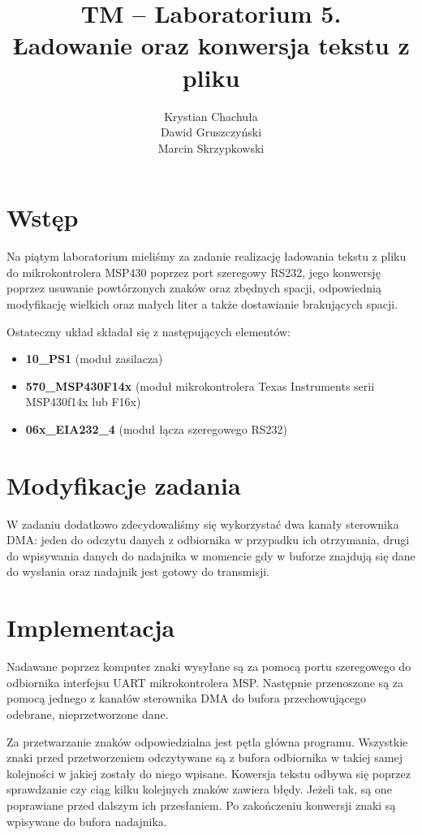 \documentclass[fleqn]{article}
\title{TM -- Laboratorium 5. \\ \large Ładowanie oraz konwersja tekstu z pliku}
\author{Krystian Chachuła \\ Dawid Gruszczyński \\ Marcin Skrzypkowski}
\begin{document}
\maketitle

\setcounter{page}{0}
\thispagestyle{empty}

\pagebreak

\setcounter{page}{1}

\section{Wstęp}
Na piątym laboratorium mieliśmy za zadanie realizację ładowania tekstu z pliku do mikrokontrolera MSP430 poprzez port szeregowy RS232, jego konwersję poprzez usuwanie powtórzonych znaków oraz zbędnych spacji, odpowiednią modyfikację wielkich oraz małych liter a także dostawianie brakujących spacji.


Ostateczny układ składał się z następujących elementów:

\begin{itemize}
	\item \textbf{10\_PS1} (moduł zasilacza)
	\item \textbf{570\_MSP430F14x} (moduł mikrokontrolera Texas Instruments serii MSP430f14x lub F16x)
	\item \textbf{06x\_EIA232\_4} (moduł łącza szeregowego RS232)
\end{itemize}

\section{Modyfikacje zadania}
W zadaniu dodatkowo zdecydowaliśmy się wykorzystać dwa kanały sterownika DMA: jeden do odczytu danych z odbiornika w przypadku ich otrzymania, drugi do wpisywania danych do nadajnika w momencie gdy w buforze znajdują się dane do wysłania oraz nadajnik jest gotowy do transmisji.



\section{Implementacja}
Nadawane poprzez komputer znaki wysyłane są za pomocą portu szeregowego do odbiornika interfejsu UART mikrokontrolera MSP. Następnie przenoszone są za pomocą jednego z kanałów sterownika DMA do bufora przechowującego odebrane, nieprzetworzone dane.

Za przetwarzanie znaków odpowiedzialna jest pętla główna programu. Wszystkie znaki przed przetworzeniem odczytywane są z bufora odbiornika w takiej samej kolejności w jakiej zostały do niego wpisane. Kowersja tekstu odbywa się poprzez sprawdzanie czy ciąg kilku kolejnych znaków zawiera błędy. Jeżeli tak, są one poprawiane przed dalszym ich przesłaniem. Po zakończeniu konwersji znaki są wpisywane do bufora nadajnika.
\end{document}
